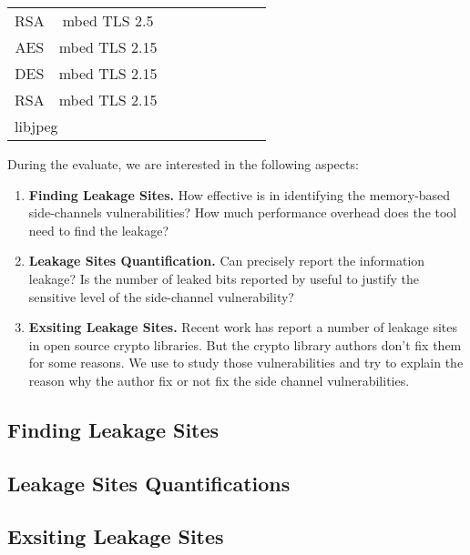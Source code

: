 \begin{table*}[t]
\begin{tabular}{|c|c|c|c|c|c|c|c|l|}
    RSA                       & mbed TLS 2.5                       &                        &                       &                       &                       &                       &                        &                  \\
    AES                       & mbed TLS 2.15                      &                        &                       &                       &                       &                       &                        &                  \\
    DES                       & mbed TLS 2.15                      &                        &                       &                       &                       &                       &                        &                  \\
    \multicolumn{1}{|l|}{RSA} & \multicolumn{1}{l|}{mbed TLS 2.15} & \multicolumn{1}{l|}{}  & \multicolumn{1}{l|}{} & \multicolumn{1}{l|}{} & \multicolumn{1}{l|}{} & \multicolumn{1}{l|}{} & \multicolumn{1}{l|}{}  &                  \\
    \multicolumn{2}{|l|}{libjpeg}                                  & \multicolumn{1}{l|}{}  & \multicolumn{1}{l|}{} & \multicolumn{1}{l|}{} & \multicolumn{1}{l|}{} & \multicolumn{1}{l|}{} & \multicolumn{1}{l|}{}  &                 
    \end{tabular}
\end{table*}

During the evaluate, we are interested in the following aspects:
\begin{enumerate}
    \item \textbf{Finding Leakage Sites.} How effective is \tool{} in 
    identifying the memory-based side-channels vulnerabilities?
    How much performance overhead does the tool need to find the 
    leakage?
    \item \textbf{Leakage Sites Quantification.} Can \tool{} precisely
    report the information leakage? Is the number of leaked bits reported 
    by \tool{} useful to justify the sensitive level of the side-channel
    vulnerability?
    \item \textbf{Exsiting Leakage Sites.} Recent work has report a number
    of leakage sites in open source crypto libraries. But the crypto
    library authors don't fix them for some reasons. We use \tool{} to
    study those vulnerabilities and try to explain the reason why the 
    author fix or not fix the side channel vulnerabilities.
\end{enumerate}


\subsection{Finding Leakage Sites}
\subsection{Leakage Sites Quantifications}
\subsection{Exsiting Leakage Sites}
